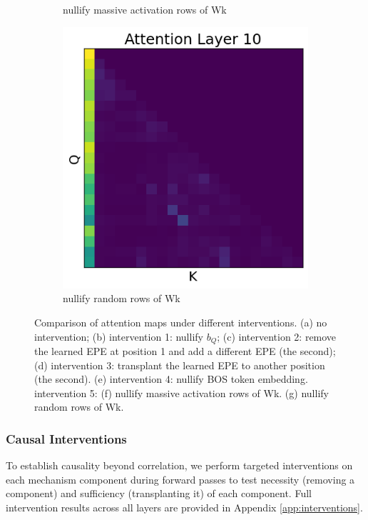 \documentclass[11pt]{article}
\begin{document}
\begin{figure}[t!]
\begin{subfigure}[t]{0.22\textwidth}
    \caption{nullify massive activation rows of Wk}
    \label{fig:intervention5}
  \end{subfigure}
    \begin{subfigure}[t]{0.22\textwidth}
    \centering
    \includegraphics[width=0.85\columnwidth]{figures/obs4_intervention5_2.png}
    \caption{nullify random rows of Wk}
    \label{fig:intervention5_2}
  \end{subfigure}

  \caption{Comparison of attention maps under different interventions. (a) no intervention; (b) intervention 1: nullify $b_Q$; (c) intervention 2: remove the learned EPE at position 1 and add a different EPE (the second); (d) intervention 3: transplant the learned EPE to another position (the second). (e) intervention 4: nullify BOS token embedding. intervention 5: (f) nullify massive activation rows of Wk. (g) nullify random rows of Wk.}
  \label{fig:interventions_comparison}
\end{figure}


\subsubsection{Causal Interventions}
\label{sec:interventions}
To establish causality beyond correlation, we perform targeted 
interventions on each mechanism component during forward passes to test necessity (removing a component) and sufficiency (transplanting it) of each component. Full intervention results across all layers are provided in Appendix \ref{app:interventions}.
\end{document}
